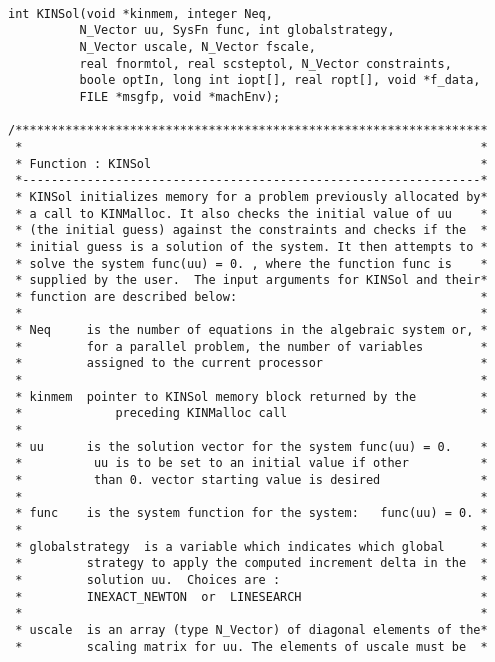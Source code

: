 \small
\begin{verbatim}

int KINSol(void *kinmem, integer Neq, 
          N_Vector uu, SysFn func, int globalstrategy, 
          N_Vector uscale, N_Vector fscale,
          real fnormtol, real scsteptol, N_Vector constraints, 
          boole optIn, long int iopt[], real ropt[], void *f_data,
          FILE *msgfp, void *machEnv);

/******************************************************************
 *                                                                *
 * Function : KINSol                                              *
 *----------------------------------------------------------------*
 * KINSol initializes memory for a problem previously allocated by*
 * a call to KINMalloc. It also checks the initial value of uu    *
 * (the initial guess) against the constraints and checks if the  *
 * initial guess is a solution of the system. It then attempts to *
 * solve the system func(uu) = 0. , where the function func is    *
 * supplied by the user.  The input arguments for KINSol and their*
 * function are described below:                                  *
 *                                                                *
 * Neq     is the number of equations in the algebraic system or, *
 *         for a parallel problem, the number of variables        *
 *         assigned to the current processor                      *
 *                                                                *
 * kinmem  pointer to KINSol memory block returned by the         *
 *             preceding KINMalloc call                           *
 *                                            
 * uu      is the solution vector for the system func(uu) = 0.    *
 *          uu is to be set to an initial value if other          *
 *          than 0. vector starting value is desired              *
 *                                                                *
 * func    is the system function for the system:   func(uu) = 0. *          
 *                                                                *
 * globalstrategy  is a variable which indicates which global     *
 *         strategy to apply the computed increment delta in the  *
 *         solution uu.  Choices are :                            *
 *         INEXACT_NEWTON  or  LINESEARCH                         *
 *                                                                *
 * uscale  is an array (type N_Vector) of diagonal elements of the*
 *         scaling matrix for uu. The elements of uscale must be  *

\end{verbatim}
